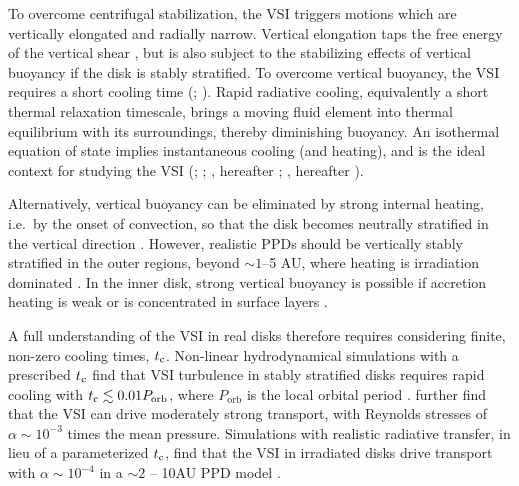 \documentclass[iop, numberedappendix]{emulateapj}
\begin{document}
To overcome centrifugal stabilization, the VSI triggers motions which are vertically elongated 
and radially narrow.  %
Vertical elongation taps the free energy of the vertical shear \citep{umurhan13}, but is also subject to 
the stabilizing effects of vertical buoyancy if the disk is stably
stratified. To overcome vertical buoyancy, the VSI requires a short cooling time
(; ). Rapid radiative 
cooling, equivalently a short thermal relaxation timescale, brings a
moving fluid element into thermal equilibrium with 
its surroundings, thereby diminishing buoyancy. %
An isothermal equation of state implies instantaneous cooling (and
heating), and is the ideal context for studying the VSI
(\citealp{urpin03}; ; \citealp{mcnally14}, hereafter ; \citealp{barker15},
hereafter ).    

Alternatively, vertical buoyancy can be eliminated by strong internal
heating, i.e.\ by the onset of convection, so that the disk becomes 
neutrally stratified in the vertical direction
. However, realistic PPDs should be vertically
stably stratified in the outer regions, beyond $\sim 1$--5 AU, where
heating is  irradiation dominated \citep{bitsch15}.  In the inner
disk, strong vertical buoyancy is possible if accretion heating is
weak or is concentrated in surface layers \citep{gammie96,lesniak11}.  

A full understanding of the VSI in real disks therefore requires
considering finite, non-zero cooling times, $t_{\rm c}$. Non-linear
hydrodynamical simulations with a prescribed  $t_{\rm c}$ find that VSI
turbulence in stably stratified disks requires rapid cooling  
with $t_{\rm c} \lesssim 0.01P_{\mathrm{orb}}$, where $P_\mathrm{orb}$ 
is the local orbital period %
 .  further find
that the VSI can drive moderately strong transport, with Reynolds
stresses of $\alpha \sim 10^{-3}$ times the mean pressure. Simulations
with realistic radiative transfer, in lieu of a parameterized $t_{\rm
  c}$, find that the VSI in irradiated disks drive transport with
$\alpha \sim 10^{-4}$  in a  $\sim 2$ -- 10AU PPD model \citep{stoll14}.  
\end{document}
